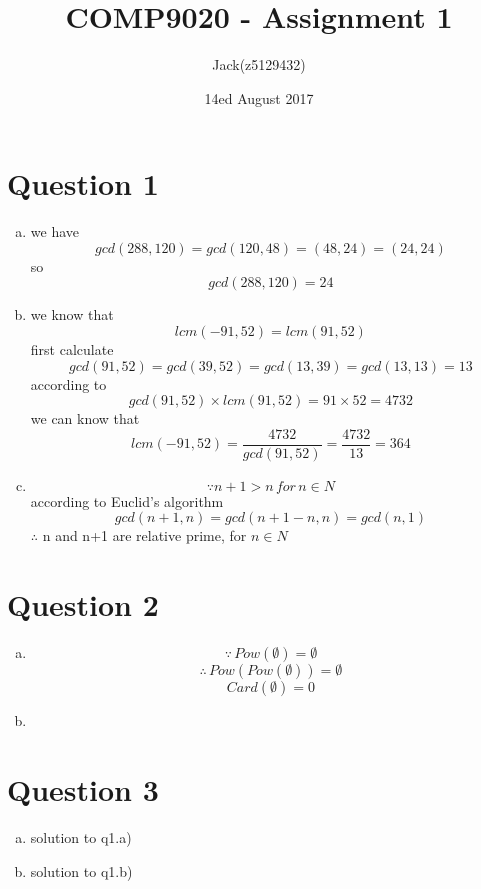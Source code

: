\documentclass[11pt, a4paper]{article}
\begin{document}
\title{COMP9020 - Assignment 1}
\author{Jack(z5129432)}
\date{ 14ed August 2017 }
\maketitle


\section*{Question 1}
\begin{enumerate}[(a)]
	\item
	we have $$gcd(288, 120) = gcd(120, 48) = (48, 24) = (24, 24)$$
	so $$gcd(288, 120) = 24$$
	\item
	we know that $$lcm(-91, 52) = lcm(91, 52)$$
	first calculate $$gcd(91, 52) = gcd(39, 52) = gcd(13, 39) = gcd(13, 13) = 13$$
	according to \cite{lcm} $$gcd(91, 52) \times lcm(91, 52) = 91 \times 52 = 4732$$ 
	we can know that $$lcm(-91, 52) = \frac{4732}{gcd(91, 52)} = \frac{4732}{13} = 364$$
	\item
	$$ \because n + 1 > n \, for \, n \in N $$
	according to Euclid's algorithm \cite{euclid}
	$$gcd(n +1, n) = gcd (n + 1 - n, n) = gcd(n, 1)$$
	$\therefore$ n and n+1 are relative prime, for $ n \in N$
\end{enumerate}

\section*{Question 2}
\begin{enumerate}[(a)]
	\item 
	$$ \because \, Pow(\emptyset) = \emptyset $$
	$$ \therefore \, Pow(Pow(\emptyset)) = \emptyset$$
	$$ Card( \emptyset) = 0 $$

	\item

\end{enumerate}

\section*{Question 3}
\begin{enumerate}[(a)]
	\item solution to q1.a)
	\item solution to q1.b)
\end{enumerate}
\end{document}
